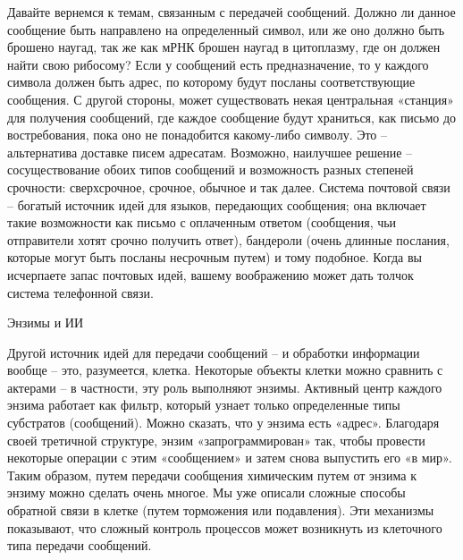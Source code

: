 \documentclass[../main.tex]{subfiles}
\begin{document}
Давайте вернемся к темам, связанным с передачей сообщений. Должно ли данное сообщение быть направлено на определенный символ, или же оно должно быть брошено наугад, так же как мРНК брошен наугад в цитоплазму, где он должен найти свою рибосому? Если у сообщений есть предназначение, то у каждого символа должен быть адрес, по которому будут посланы соответствующие сообщения. С другой стороны, может существовать некая центральная «станция» для получения сообщений, где каждое сообщение будут храниться, как письмо до востребования, пока оно не понадобится какому-либо символу. Это \--- альтернатива доставке писем адресатам. Возможно, наилучшее решение \--- сосуществование обоих типов сообщений и возможность разных степеней срочности: сверхсрочное, срочное, обычное и так далее. Система почтовой связи \--- богатый источник идей для языков, передающих сообщения; она включает такие возможности как письмо с оплаченным ответом (сообщения, чьи отправители хотят срочно получить ответ), бандероли (очень длинные послания, которые могут быть посланы несрочным путем) и тому подобное. Когда вы исчерпаете запас почтовых идей, вашему воображению может дать толчок система телефонной связи.

Энзимы и ИИ

Другой источник идей для передачи сообщений \--- и обработки информации вообще \--- это, разумеется, клетка. Некоторые объекты клетки можно сравнить с актерами \--- в частности, эту роль выполняют энзимы. Активный центр каждого энзима работает как фильтр, который узнает только определенные типы субстратов (сообщений). Можно сказать, что у энзима есть «адрес». Благодаря своей третичной структуре, энзим «запрограммирован» так, чтобы провести некоторые операции с этим «сообщением» и затем снова выпустить его «в мир». Таким образом, путем передачи сообщения химическим путем от энзима к энзиму можно сделать очень многое. Мы уже описали сложные способы обратной связи в клетке (путем торможения или подавления). Эти механизмы показывают, что сложный контроль процессов может возникнуть из клеточного типа передачи сообщений.
\end{document}

